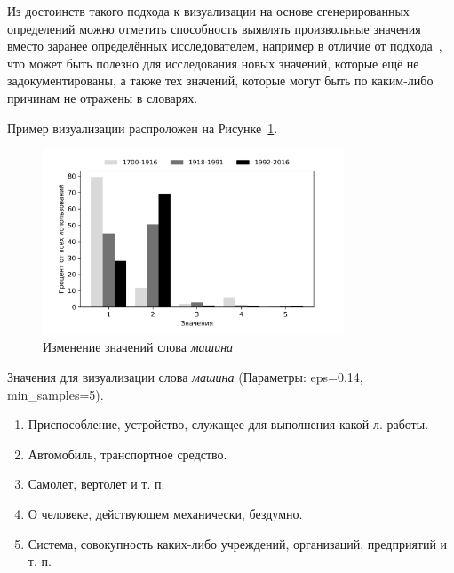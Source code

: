 \documentclass[LI,VKR]{HSEUniversity}
\begin{document}
Из достоинств такого подхода к визуализации на основе сгенерированных определений
можно отметить способность выявлять произвольные значения вместо заранее определённых
исследователем, например в отличие от подхода~\cite{GlossReader}, что может быть полезно для исследования новых значений, которые
ещё не задокументированы, а также тех значений,
которые могут быть по каким-либо причинам не отражены в словарях.

Пример визуализации распроложен на Рисунке~\ref{fig:Машина_example}.

\begin{figure}[H]
	\centering
	\includegraphics[width=0.8\textwidth]{img/visualizations/mashina_minimal}
	\caption{Изменение значений слова \textit{машина}}
	\label{fig:Машина_example}
\end{figure}

Значения для визуализации слова \textit{машина} (Параметры: eps=0.14, min\_samples=5).

\begin{enumerate}
    \item Приспособление, устройство, служащее для выполнения какой-л. работы.
    \item Автомобиль, транспортное средство.
    \item Самолет, вертолет и т. п.
    \item О человеке, действующем механически, бездумно.
    \item Система, совокупность каких-либо учреждений, организаций, предприятий и т. п.
\end{enumerate}

\end{document}
